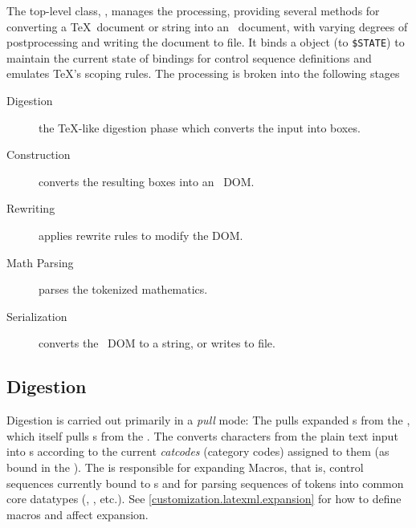 \documentclass{book}
\newcommand{\ltxcode}{\lstinline[style=inlinelatexml]}
\begin{document}
The top-level class, , manages the processing, providing several methods
for converting a \TeX\ document or string into an \XML\ document, with varying degrees
of postprocessing and writing the document to file.
It binds a  object (to \ltxcode|$STATE|)%
to maintain the current state
of bindings for control sequence definitions and emulates \TeX's scoping rules.
The processing is broken into the following stages
\begin{description}
   \item[Digestion] the \TeX-like digestion phase which converts the input into boxes.
   \item[Construction] converts the resulting boxes into an \XML\ DOM.
   \item[Rewriting] applies rewrite rules to modify the DOM.
   \item[Math Parsing] parses the tokenized mathematics.
   \item[Serialization] converts the \XML\ DOM to a string, or writes to file.
\end{description}

\subsection{Digestion}\label{architecture.digestion}
%
%
%
%
%
%
%
%
%
%
%

Digestion is carried out primarily in a \emph{pull} mode: The 
pulls expanded s from the , which itself pulls s from 
the .  The  converts characters from the plain text input
into s according to the current \emph{catcodes} (category codes) assigned to
them (as bound in the ).  
The  is responsible for expanding Macros,
that is, control sequences currently bound to s
and for parsing sequences of tokens into common core datatypes
(, , etc.).
See \ref{customization.latexml.expansion} for how to define macros
and affect expansion.
\end{document}
